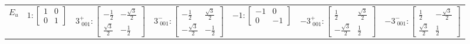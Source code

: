 \documentclass[fleqn,8pt,landscape]{jsarticle}
\begin{document}
\begin{longtable}{ccccccc}
$ E_{u} $ & $ 1:\begin{bmatrix} 1 & 0 \\ 0 & 1 \end{bmatrix} $ & $ 3^{+}_{\,\,001}:\begin{bmatrix} - \frac{1}{2} & - \frac{\sqrt{3}}{2} \\ \frac{\sqrt{3}}{2} & - \frac{1}{2} \end{bmatrix} $ & $ 3^{-}_{\,\,001}:\begin{bmatrix} - \frac{1}{2} & \frac{\sqrt{3}}{2} \\ - \frac{\sqrt{3}}{2} & - \frac{1}{2} \end{bmatrix} $ & $ -1:\begin{bmatrix} -1 & 0 \\ 0 & -1 \end{bmatrix} $ & $ -3^{+}_{\,\,001}:\begin{bmatrix} \frac{1}{2} & \frac{\sqrt{3}}{2} \\ - \frac{\sqrt{3}}{2} & \frac{1}{2} \end{bmatrix} $ & $ -3^{-}_{\,\,001}:\begin{bmatrix} \frac{1}{2} & - \frac{\sqrt{3}}{2} \\ \frac{\sqrt{3}}{2} & \frac{1}{2} \end{bmatrix} $ \\
\end{longtable}
\end{document}
